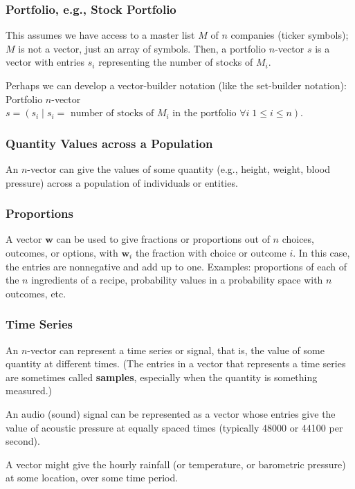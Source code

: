 \documentclass[11pt]{book}
\theoremstyle{definition}
\theoremstyle{plain}
\theoremstyle{problemstyle}
\theoremstyle{remark}
\theoremstyle{definition}
\begin{document}
\subsubsection*{Portfolio, e.g., Stock Portfolio}
\label{sssec:portfolio}
This assumes we have access to a master list $M$ of $n$ companies (ticker symbols); $M$ is not a vector, just an array of symbols. Then, a portfolio $n$-vector $s$ is a vector with entries $s_i$ representing the number of stocks of $M_i$. 

Perhaps we can develop a vector-builder notation (like the set-builder notation): Portfolio $n$-vector $s=(s_i\mid s_i=\text{ number of stocks of } M_i\text { in the portfolio } \forall i\; 1\leq i\leq n)$.

\subsubsection*{Quantity Values across a Population}
An $n$-vector can give the values of some quantity (e.g., height, weight, blood pressure) across a population of individuals or entities.

\subsubsection*{Proportions}
A vector $\boldsymbol{w}$ can be used to give fractions or proportions out of $n$ choices, outcomes, or options, with $\boldsymbol{w}_i$ the fraction with choice or outcome $i$. In this case, the entries are nonnegative and add up to one. Examples: proportions of each of the $n$ ingredients of a recipe, probability values in a probability space with $n$ outcomes, etc.

\subsubsection*{Time Series}
An $n$-vector can represent a time series or signal, that is, the value of some quantity at different times. (The entries in a vector that represents a time series are sometimes called \textbf{samples}, especially when the quantity is something measured.) 

An audio (sound) signal can be represented as a vector whose entries give the value of acoustic pressure at equally spaced times (typically 48000 or 44100 per second). 

A vector might give the hourly rainfall (or temperature, or barometric pressure) at some location, over some time period. 
\end{document}
